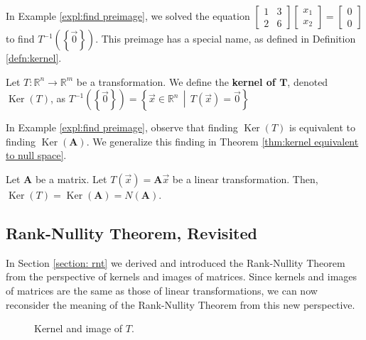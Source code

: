 \documentclass[]{book}
\DeclareMathOperator{\image}{Im}
\DeclareMathOperator{\kernel}{Ker}
\newcommand{\inv}[1]{\ensuremath{{#1}^{-1}}}
\newcommand{\vecxx}[1][x]{\ensuremath{\begin{bmatrix}
#1_1 \\
#1_2
\end{bmatrix}}}
\newcommand{\suchthat}{\,\middle|\,}
\newcommand{\mat}[1]{\ensuremath{\mathbf{#1}}}
\newcommand{\R}{\ensuremath{\mathbb{R}}}
\begin{document}
In Example \ref{expl:find preimage}, we solved the equation $\begin{bmatrix}1 & 3 \\ 2 & 6 \end{bmatrix}\vecxx = \begin{bmatrix}0 \\ 0\end{bmatrix}$ to find $\inv{T}\left(\left\{\vec{0}\right\}\right)$. This preimage has a special name, as defined in Definition \ref{defn:kernel}.
\begin{definition}
    \label{defn:kernel}
    Let $T:\R^n \to \R^m$ be a transformation. We define the \textbf{kernel of $\pmb{T}$}, denoted $\kernel(T)$, as $\inv{T}\left(\left\{\vec{0}\right\}\right) = \left\{\vec{x} \in \R^n \suchthat T(\vec{x}) = \vec{0}\right\}$
\end{definition}

In Example \ref{expl:find preimage}, observe that finding $\kernel(T)$ is equivalent to finding $\kernel(\mat{A})$. We generalize this finding in Theorem \ref{thm:kernel equivalent to null space}.
\begin{theorem}
    \label{thm:kernel equivalent to null space}
    Let $\mat{A}$ be a matrix. Let $T(\vec{x}) = \mat{A}\vec{x}$ be a linear transformation. Then, $\kernel(T) = \kernel(\mat{A}) = N(\mat{A})$.
\end{theorem}

\subsection{Rank-Nullity Theorem, Revisited}
In Section \ref{section: rnt} we derived and introduced the Rank-Nullity Theorem from the perspective of kernels and images of matrices. Since kernels and images of matrices are the same as those of linear transformations, we can now reconsider the meaning of the Rank-Nullity Theorem from this new perspective. 

\begin{figure}
    \centering
    \caption{Kernel and image of $T$.}
    \label{fig: orthogonal projection to plane for rnt}
\end{figure}
\end{document}
